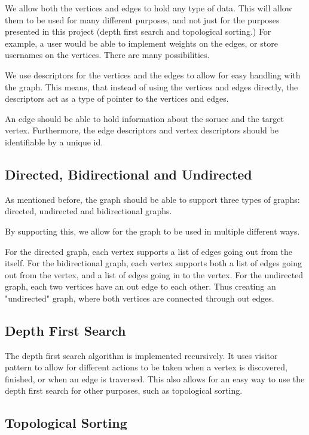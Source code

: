 \documentclass{article}
\begin{document}
We allow both the vertices and edges to hold any type of data.
This will allow them to be used for many different purposes, and not 
just for the purposes presented in this project (depth first search and topological sorting.)
For example, a user would be able to implement weights on the edges, or 
store usernames on the vertices. There are many possibilities.

We use descriptors for the vertices and the edges to allow for easy handling 
with the graph. This means, that instead of using the vertices and edges directly,
the descriptors act as a type of pointer to the vertices and edges.

An edge should be able to hold information about the soruce and the target vertex. 
Furthermore, the edge descriptors and vertex descriptors should be identifiable by a unique id. 

\subsection{Directed, Bidirectional and Undirected}

As mentioned before, the graph should be able to support three types of graphs: 
directed, undirected and bidirectional graphs. 

By supporting this, we allow for the graph to be used in multiple different ways.

For the directed graph, each vertex supports a list of edges going out from the itself.
For the bidirectional graph, each vertex supports both a list of edges going out from the vertex, and a list of edges going in to the vertex.
For the undirected graph, each two vertices have an out edge to each other. Thus creating an "undirected" graph, where both vertices are connected through out edges.


\subsection{Depth First Search}

The depth first search algorithm is implemented recursively. It uses visitor pattern to allow for different actions to be taken when a vertex is discovered, finished, or when an edge is traversed.
This also allows for an easy way to use the depth first search for other purposes, such as topological sorting.


\subsection{Topological Sorting}
\end{document}
